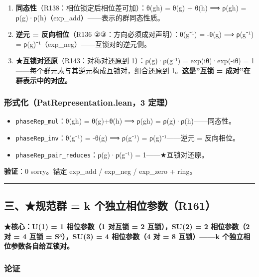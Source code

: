 \documentclass[
]{article}
\providecommand{\tightlist}{%
  \setlength{\itemsep}{0pt}\setlength{\parskip}{0pt}}
\begin{document}
\begin{enumerate}
\def\labelenumi{\arabic{enumi}.}
\tightlist
\item
  \textbf{同态性}（R138：相位锁定后相位差可加）：θ(gh) = θ(g) + θ(h) ⟹
  ρ(gh) = ρ(g)·ρ(h)（exp\_add）------表示的群同态性质。
\item
  \textbf{逆元 = 反向相位}（R136 ②③：方向必须成对声明）：θ(g⁻¹) = -θ(g)
  ⟹ ρ(g⁻¹) = ρ(g)⁻¹（exp\_neg）------互锁对的逆元侧。
\item
  \textbf{★互锁对还原}（R143：对称对还原到 1）：ρ(g)·ρ(g⁻¹) =
  exp(iθ)·exp(-iθ) = 1------每个群元素与其逆元构成互锁对，组合还原到
  1。\textbf{这是''互锁 = 成对''在群表示中的对应。}
\end{enumerate}

\subsubsection{形式化（PatRepresentation.lean，3
定理）}\label{ux5f62ux5f0fux5316patrepresentation.lean3-ux5b9aux7406-1}

\begin{itemize}
\tightlist
\item
  \texttt{phaseRep\_mul}：θ(gh) = θ(g)+θ(h) ⟹ ρ(gh) =
  ρ(g)·ρ(h)------同态性。
\item
  \texttt{phaseRep\_inv}：θ(g⁻¹) = -θ(g) ⟹ ρ(g⁻¹) = ρ(g)⁻¹------逆元 =
  反向相位。
\item
  \texttt{phaseRep\_pair\_reduces}：ρ(g)·ρ(g⁻¹) = 1------★互锁对还原。
\end{itemize}

\textbf{验证}：0 sorry。锚定 exp\_add / exp\_neg / exp\_zero + ring。

\begin{center}\rule{0.5\linewidth}{0.5pt}\end{center}

\subsection{三、★规范群 = k
个独立相位参数（R161）}\label{ux4e09ux89c4ux8303ux7fa4-k-ux4e2aux72ecux7acbux76f8ux4f4dux53c2ux6570r161}

\textbf{★核心：U(1) = 1 相位参数（1 对互锁 = 2 互锁），SU(2) = 2
相位参数（2 对 = 4 互锁 = S³），SU(3) = 4 相位参数（4 对 = 8
互锁）------k 个独立相位参数各自给互锁对。}

\subsubsection{论证}\label{ux8bbaux8bc1-2}
\end{document}
